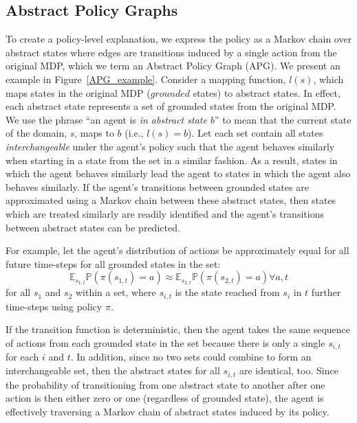 \documentclass[letterpaper]{article} %
\begin{document}
\subsection{Abstract Policy Graphs} \label{approach_graphRepresentation}
To create a policy-level explanation, we express the policy as a Markov chain over abstract states where edges are transitions induced by a single action from the original MDP, which we term an Abstract Policy Graph (APG). We present an example in Figure~\ref{APG_example}.
Consider a mapping function, $l(s)$, which maps states in the original MDP ($grounded$ states) to abstract states. In effect, each abstract state represents a set of grounded states from the original MDP. 
We use the phrase ``an agent is \textit{in abstract state $b$}'' to mean that the current state of the domain, $s$, maps to $b$ (i.e., $l(s) = b$).
Let each set contain all states \textit{interchangeable} under the agent's policy such that the agent behaves similarly when starting in a state from the set in a similar fashion. As a result, states in which the agent behaves similarly lead the agent to states in which the agent also behaves similarly. If the agent's transitions between grounded states are approximated using a Markov chain between these abstract states, then states which are treated similarly are readily identified and the agent's transitions between abstract states can be predicted.

For example, let the agent's distribution of actions be approximately equal for all future time-steps for all grounded states in the set: 
\begin{equation} \label{inter}
\mathbb{E}_{s_{1,t}} \mathbb{P}(\pi(s_{1,t}) = a) \approx \mathbb{E}_{s_{2,t}} \mathbb{P}(\pi(s_{2,t}) = a) \forall a, t
\end{equation}
for all $s_1$ and $s_2$ within a set, where $s_{i,t}$ is the state reached from $s_{i}$ in $t$ further time-steps using policy $\pi$.

If the transition function is deterministic, then the agent takes the same sequence of actions from each grounded state in the set because there is only a single $s_{i,t}$ for each $i$ and $t$. In addition, since no two sets could combine to form an interchangeable set, then the abstract states for all $s_{i,t}$ are identical, too. Since the probability of transitioning from one abstract state to another after one action is then either zero or one (regardless of grounded state), the agent is effectively traversing a Markov chain of abstract states induced by its policy. 
\end{document}
